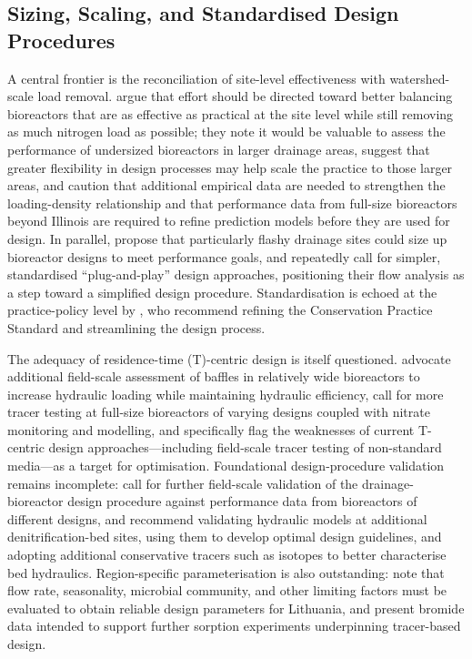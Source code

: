 \subsection{Sizing, Scaling, and Standardised Design Procedures}
A central frontier is the reconciliation of site-level effectiveness with watershed-scale load removal. \textcite{Christianson2026} argue that effort should be directed toward better balancing bioreactors that are as effective as practical at the site level while still removing as much nitrogen load as possible; they note it would be valuable to assess the performance of undersized bioreactors in larger drainage areas, suggest that greater flexibility in design processes may help scale the practice to those larger areas, and caution that additional empirical data are needed to strengthen the loading-density relationship and that performance data from full-size bioreactors beyond Illinois are required to refine prediction models before they are used for design. In parallel, \textcite{Dougherty2020b} propose that particularly flashy drainage sites could size up bioreactor designs to meet performance goals, and repeatedly call for simpler, standardised ``plug-and-play'' design approaches, positioning their flow analysis as a step toward a simplified design procedure. Standardisation is echoed at the practice-policy level by \textcite{Christianson2021}, who recommend refining the Conservation Practice Standard and streamlining the design process.

The adequacy of residence-time (T)-centric design is itself questioned. \textcite{deOliveira2023} advocate additional field-scale assessment of baffles in relatively wide bioreactors to increase hydraulic loading while maintaining hydraulic efficiency, call for more tracer testing at full-size bioreactors of varying designs coupled with nitrate monitoring and modelling, and specifically flag the weaknesses of current T-centric design approaches---including field-scale tracer testing of non-standard media---as a target for optimisation. Foundational design-procedure validation remains incomplete: \textcite{Christianson2013} call for further field-scale validation of the drainage-bioreactor design procedure against performance data from bioreactors of different designs, and \textcite{Ghane2015} recommend validating hydraulic models at additional denitrification-bed sites, using them to develop optimal design guidelines, and adopting additional conservative tracers such as isotopes to better characterise bed hydraulics. Region-specific parameterisation is also outstanding: \textcite{Povilaitis2020} note that flow rate, seasonality, microbial community, and other limiting factors must be evaluated to obtain reliable design parameters for Lithuania, and \textcite{Ghane2019} present bromide data intended to support further sorption experiments underpinning tracer-based design.

